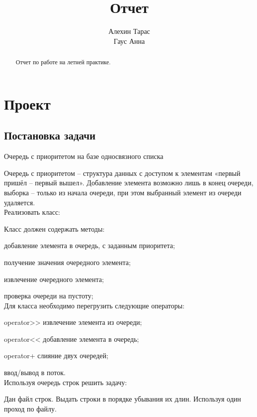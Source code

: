 \documentclass[12pt]{report}
\begin{document}
	
\title{Отчет}
\author{Алехин Тарас\\ 
	Гаус Анна}

\vfill\tableofcontents\clearpage

\begin{abstract}
	Отчет по работе на летней практике.
\end{abstract}
\chapter{Проект}
\section{Постановка задачи}

	Очередь с приоритетом на базе односвязного списка
	
	Очередь с приоритетом \autocite{greenwade93}  –  структура данных с доступом к элементам «первый пришёл – первый вышел». Добавление элемента возможно лишь в конец очереди, выборка – только из начала очереди, при этом выбранный элемент из очереди удаляется.\\
	
	
	Реализовать класс:
	
	Класс должен содержать методы:
	
	добавление элемента в очередь, с заданным приоритета;
	
	получение значения очередного элемента;
	
	извлечение очередного элемента;
	
	проверка очереди на пустоту;\\
	
	
	Для класса необходимо перегрузить следующие операторы:
	
	operator>> извлечение элемента из очереди;
	
	operator<< добавление элемента в очередь;
	
	operator+ слияние двух очередей;
	
	ввод/вывод в поток.\\
	
	Используя очередь строк решить задачу:
	
	
	Дан файл строк. Выдать строки в порядке убывания их длин. Используя один проход по файлу.
	
\end{document}
